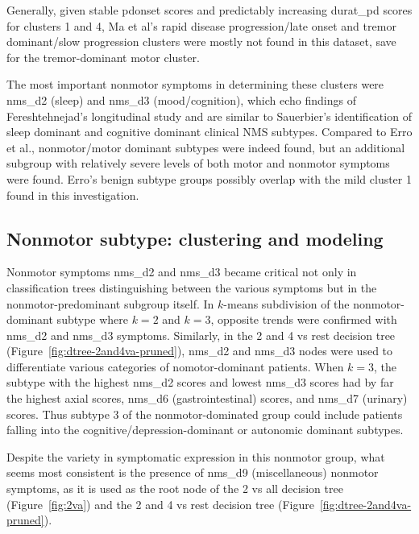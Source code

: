\documentclass[preprint,3p,twocolumn]{elsarticle} %
\begin{document}
Generally, given stable pdonset scores and predictably increasing durat\_pd
scores for clusters 1 and 4, Ma et al's rapid disease
progression/late onset and tremor dominant/slow progression clusters
\cite{ma15} were mostly not found in this dataset, save for the tremor-dominant
motor cluster.

The most important nonmotor symptoms in determining these clusters were nms\_d2
(sleep) and nms\_d3 (mood/cognition), which echo findings of Fereshtehnejad's
longitudinal study\cite{fereshtehnejad15} and are similar to Sauerbier's
identification of sleep dominant and cognitive dominant clinical NMS subtypes\cite{sauerbier15}.
Compared to Erro et al.\cite{erro13}, nonmotor/motor
dominant subtypes were indeed found, but an additional subgroup with relatively
severe levels of both motor and nonmotor symptoms were found. Erro's benign
subtype groups possibly overlap with the mild cluster 1 found in this
investigation.

\subsection{Nonmotor subtype: clustering and modeling}
Nonmotor symptoms nms\_d2 and nms\_d3 became critical not only in
classification trees distinguishing between the various symptoms but in the
nonmotor-predominant subgroup itself. In $k$-means subdivision of the
nonmotor-dominant subtype where $k = 2$ and $k = 3$, opposite trends were
confirmed with nms\_d2 and nms\_d3 symptoms. Similarly, in the 2 and 4 vs rest
decision tree (Figure~\ref{fig:dtree-2and4va-pruned}), nms\_d2 and nms\_d3 nodes were
used to differentiate various categories of nomotor-dominant patients.
When $k = 3$, the subtype with the highest nms\_d2 scores and lowest
nms\_d3 scores had by far the highest axial scores, nms\_d6 (gastrointestinal)
scores, and nms\_d7 (urinary) scores. Thus subtype 3 of the nonmotor-dominated
group could include patients falling into the cognitive/depression-dominant or
autonomic dominant subtypes.

Despite the variety in symptomatic expression in this nonmotor group, what
seems most consistent is the presence of nms\_d9 (miscellaneous) nonmotor
symptoms, as it is used as the root node of the 2 vs all decision tree
(Figure~\ref{fig:2va}) and the 2 and 4 vs rest decision tree
(Figure~\ref{fig:dtree-2and4va-pruned}).
\end{document}
